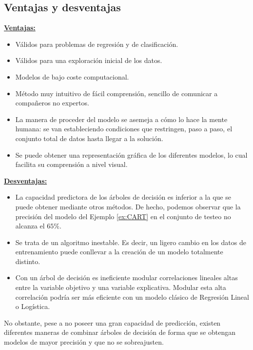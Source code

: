 \documentclass[12pt,twoside]{article}
\begin{document}
\subsection{Ventajas y desventajas}
\textbf{\underline{Ventajas:}}
\begin{itemize}
\item Válidos para problemas de regresión y de clasificación.
\item Válidos para una exploración inicial de los datos.
\item Modelos de bajo coste computacional.
\item Método muy intuitivo de fácil comprensión, sencillo de comunicar a compañeros no expertos.
\item La manera de proceder del modelo se asemeja a cómo lo hace la mente humana: se van estableciendo condiciones que restringen, paso a paso, el conjunto total de datos hasta llegar a la solución.
\item Se puede obtener una representación gráfica de los diferentes modelos, lo cual facilita su comprensión a nivel visual.
\end{itemize}

\textbf{\underline{Desventajas:}}
\begin{itemize}
\item La capacidad predictora de los árboles de decisión es inferior a la que se puede obtener mediante otros métodos. De hecho, podemos observar que la precisión del modelo del Ejemplo \ref{ex:CART} en el conjunto de testeo no alcanza el $65\%$.
\item Se trata de un algoritmo inestable. Es decir, un ligero cambio en los datos de entrenamiento puede conllevar a la creación de un modelo totalmente distinto. %
\item Con un árbol de decisión es ineficiente modular correlaciones lineales altas entre la variable objetivo y una variable explicativa. Modular esta alta correlación podría ser más eficiente con un modelo clásico de Regresión Lineal o Logística.
\end{itemize}


No obstante, pese a no poseer una gran capacidad de predicción, existen diferentes maneras de combinar árboles de decisión de forma que se obtengan modelos de mayor precisión y que no se sobreajusten.




\newpage
\end{document}
